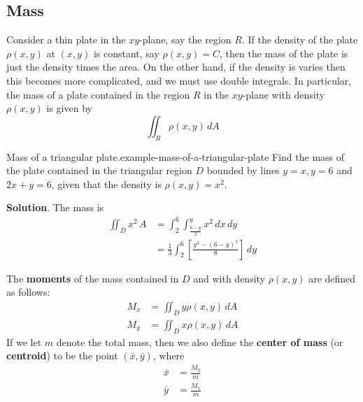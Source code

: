 \documentclass[10pt,]{book}
\newcommand{\terminology}[1]{\textbf{#1}}
\numberwithin{equation}{section}
\begin{document}
\subsection[{Mass}]{Mass}\label{subsection-mass}
\hypertarget{p-1496}{}%
Consider a thin plate in the \(xy\)-plane, say the region \(R\). If the density of the plate \(\rho(x,y)\) at \((x,y)\) is constant, say \(\rho(x,y) = C\), then the mass of the plate is just the density times the area. On the other hand, if the density is varies then this becomes more complicated, and we must use double integrals. In particular, the mass of a plate contained in the region \(R\) in the \(xy\)-plane with density \(\rho(x,y)\) is given by%
\begin{equation*}
\iint_{R}\rho(x,y)\,dA
\end{equation*}
%
\begin{example}{Mass of a triangular plate.}{example-mass-of-a-triangular-plate}%
\hypertarget{p-1497}{}%
Find the mass of the plate contained in the triangular region \(D\) bounded by lines \(y=x, y = 6\) and \(2x+y = 6\), given that the density is \(\rho(x,y) = x^{2}\).%
\par\smallskip%
\noindent\textbf{Solution}.\hypertarget{solution-246}{}\quad%
\hypertarget{p-1498}{}%
The mass is%
\begin{align*}
\iint_{D}x^{2}\,A & =  \int_{2}^{6}\int_{\frac{6-y}{2}}^{y}x^{2}\,dx\,dy\\
& = \frac{1}{3}\int_{2}^{6}\left[\frac{y^{3} - (6-y)^{3}}{8}\right]\,dy 
\end{align*}
%
\end{example}
\hypertarget{p-1499}{}%
The \terminology{moments} of the mass contained in \(D\) and with density \(\rho(x,y)\) are defined as follows:%
\begin{align*}
M_{x} & = \iint_{D}y\rho(x,y)\,dA \\
M_{y} & = \iint_{D}x\rho(x,y)\,dA 
\end{align*}
If we let \(m\) denote the total mass, then we also define the \terminology{center of mass} (or \terminology{centroid}) to be the point \((\bar{x},\bar{y})\), where%
\begin{align*}
\bar{x} & = \frac{M_{y}}{m} \\
\bar{y} & = \frac{M_{x}}{m} 
\end{align*}
%
\end{document}
